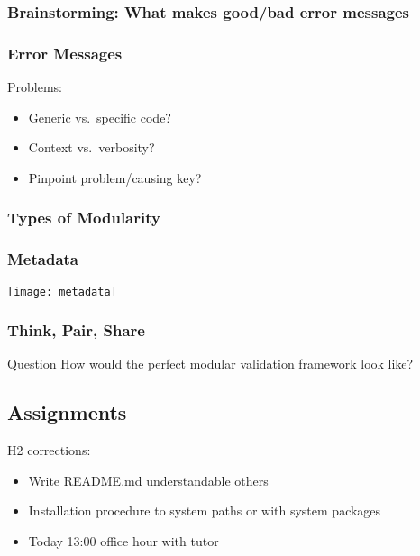 \begin{frame}[fragile]
	\frametitle{Brainstorming: What makes good/bad error messages}
\end{frame}

\begin{frame}[fragile]
	\frametitle{Error Messages}

	Problems:
	\begin{itemize}[<+-| alert@+>]
	\item Generic vs.\ specific code?
	\item Context vs.\ verbosity?
	\item Pinpoint problem/causing key?
	\end{itemize}
\end{frame}

\breakframe

\begin{frame}
	\frametitle{Types of Modularity}
	\pause
	\Large
\end{frame}

\begin{frame}
	\frametitle{Metadata}

	\pause
	\texttt{[image: metadata]}
\end{frame}

\begin{assignment}
	\frametitle{Think, Pair, Share}

	\begin{alertblock}{Question}
	How would the perfect modular validation framework look like?
	\end{alertblock}
\end{assignment}

\breakframe

\subsection{Assignments}

\begin{assignment}
	H2 corrections:
	\begin{itemize}[<+-| alert@+>]
	\item Write README.md understandable others
	\item Installation procedure to system paths or with system packages
	\item Today 13:00 office hour with tutor
	\end{itemize}
\end{assignment}

